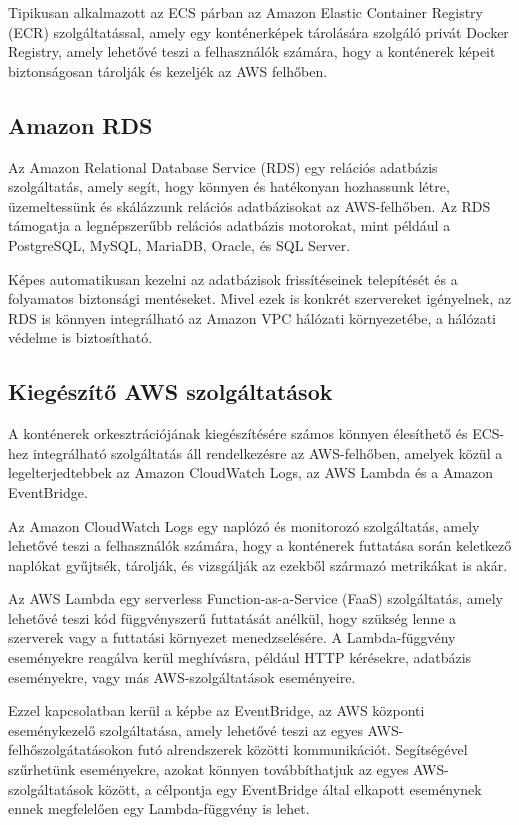 Tipikusan alkalmazott az ECS párban az Amazon Elastic Container Registry (ECR) szolgáltatással, amely egy konténerképek tárolására szolgáló privát Docker Registry, amely lehetővé teszi a felhasználók számára, hogy a konténerek képeit biztonságosan tárolják és kezeljék az AWS felhőben.

\subsection{Amazon RDS}

Az Amazon Relational Database Service (RDS) egy relációs adatbázis szolgáltatás, amely segít, hogy könnyen és hatékonyan hozhassunk létre, üzemeltessünk és skálázzunk relációs adatbázisokat az AWS-felhőben. Az RDS támogatja a legnépszerűbb relációs adatbázis motorokat, mint például a PostgreSQL, MySQL, MariaDB, Oracle, és SQL Server.

Képes automatikusan kezelni az adatbázisok frissítéseinek telepítését és a folyamatos biztonsági mentéseket. Mivel ezek is konkrét szervereket igényelnek, az RDS is könnyen integrálható az Amazon VPC hálózati környezetébe, a hálózati védelme is biztosítható.

\subsection{Kiegészítő AWS szolgáltatások}

A konténerek orkesztrációjának kiegészítésére számos könnyen élesíthető és ECS-hez integrálható szolgáltatás áll rendelkezésre az AWS-felhőben, amelyek közül a legelterjedtebbek az Amazon CloudWatch Logs, az AWS Lambda és a Amazon EventBridge.

Az Amazon CloudWatch Logs egy naplózó és monitorozó szolgáltatás, amely lehetővé teszi a felhasználók számára, hogy a konténerek futtatása során keletkező naplókat gyűjtsék, tárolják, és vizsgálják az ezekből származó metrikákat is akár.

Az AWS Lambda egy serverless Function-as-a-Service (FaaS) szolgáltatás, amely lehetővé teszi kód függvényszerű futtatását anélkül, hogy szükség lenne a szerverek vagy a futtatási környezet menedzselésére. A Lambda-függvény eseményekre reagálva kerül meghívásra, például HTTP kérésekre, adatbázis eseményekre, vagy más AWS-szolgáltatások eseményeire.

Ezzel kapcsolatban kerül a képbe az EventBridge, az AWS központi eseménykezelő szolgáltatása, amely lehetővé teszi az egyes AWS-felhőszolgátatásokon futó alrendszerek közötti kommunikációt. Segítségével szűrhetünk eseményekre, azokat könnyen továbbíthatjuk az egyes AWS-szolgáltatások között, a célpontja egy EventBridge által elkapott eseménynek ennek megfelelően egy Lambda-függvény is lehet.

